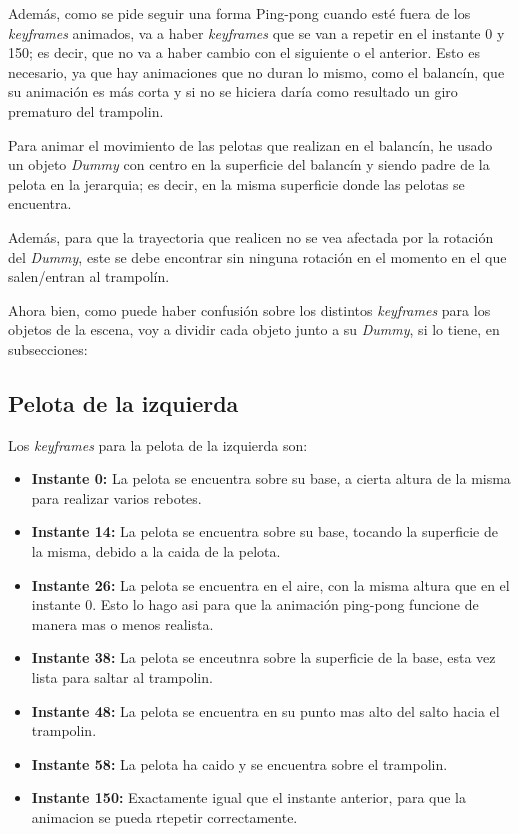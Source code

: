 \documentclass{article}
\begin{document}
Además, como se pide seguir una forma Ping-pong cuando esté fuera de los \textit{keyframes} animados, va a haber \textit{keyframes} que se van a repetir en el instante 0 y 150; es decir, que no va a haber cambio con el siguiente o el anterior. Esto es necesario, ya que hay animaciones que no duran lo mismo, como el balancín, que su animación es más corta y si no se hiciera daría como resultado un giro prematuro del trampolin.

\bigskip

Para animar el movimiento de las pelotas que realizan en el balancín, he usado un objeto \textit{Dummy} con centro en la superficie del balancín y siendo padre de la pelota en la jerarquia; es decir, en la misma superficie donde las pelotas se encuentra.


Además, para que la trayectoria que realicen no se vea afectada por la rotación del \textit{Dummy}, este se debe encontrar sin ninguna rotación en el momento en el que salen/entran al trampolín.

\bigskip

Ahora bien, como puede haber confusión sobre los distintos \textit{keyframes} para los objetos de la escena, voy a dividir cada objeto junto a su \textit{Dummy}, si lo tiene, en subsecciones:

\subsection{Pelota de la izquierda}

Los \textit{keyframes} para la pelota de la izquierda son:

\begin{itemize}
    \item \textbf{Instante 0: }La pelota se encuentra sobre su base, a cierta altura de la misma para realizar varios rebotes.
    \item \textbf{Instante 14: }La pelota se encuentra sobre su base, tocando la superficie de la misma, debido a la caida de la pelota.
    \item \textbf{Instante 26: }La pelota se encuentra en el aire, con la misma altura que en el instante 0. Esto lo hago asi para que la animación ping-pong funcione de manera mas o menos realista.
    \item \textbf{Instante 38: }La pelota se enceutnra sobre la superficie de la base, esta vez lista para saltar al trampolin.
    \item \textbf{Instante 48: }La pelota se encuentra en su punto mas alto del salto hacia el trampolin.
    \item \textbf{Instante 58: }La pelota ha caido y se encuentra sobre el trampolin.
    \item \textbf{Instante 150: }Exactamente igual que el instante anterior, para que la animacion se pueda rtepetir correctamente.
\end{itemize}
\end{document}

